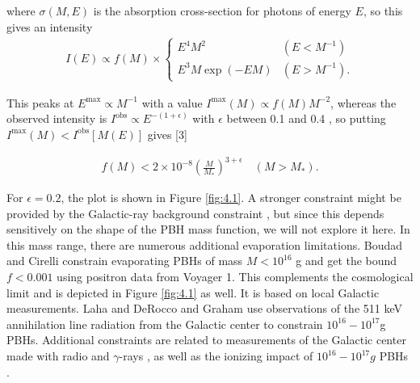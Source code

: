 where $\sigma(M, E)$ is the absorption cross-section for photons of energy $E$, so this gives an intensity
\begin{align}
    I(E) \propto f(M) \times \begin{cases}E^4 M^2 & \left(E<M^{-1}\right) \\ E^3 M \exp (-E M) & \left(E>M^{-1}\right) .\end{cases} \label{4.5}
\end{align}

This peaks at $E^{\max } \propto M^{-1}$ with a value $I^{\max }(M) \propto f(M) M^{-2}$, whereas the observed intensity is $I^{\mathrm{obs}} \propto E^{-(1+\epsilon)}$ with $\epsilon$ between 0.1 and 0.4 , so putting $I^{\max }(M)<I^{\mathrm{obs}}[M(E)]$ gives [3]

\begin{align}
    f(M)<2 \times 10^{-8}\left(\frac{M}{M_*}\right)^{3+\epsilon} \quad\left(M>M_*\right) .\label{4.6}
\end{align}


For $\epsilon = 0.2$, the plot is shown in Figure \ref{fig:4.1}. A stronger constraint might be provided by the Galactic-ray background constraint \cite{Carr:2016hva}, but since this depends sensitively on the shape of the PBH mass function, we will not explore it here. In this mass range, there are numerous additional evaporation limitations. Boudad and Cirelli \cite{Boudaud:2018hqb} constrain evaporating PBHs of mass $M < 10^{16}$ g and get the bound $f < 0.001$ using positron data from Voyager 1. This complements the cosmological limit and is depicted in Figure \ref{fig:4.1}   as well. It is based on local Galactic measurements. Laha \cite{Laha:2019ssq} and DeRocco and Graham \cite{DeRocco:2019fjq} use observations of the 511 keV annihilation line radiation from the Galactic center to constrain $10^{16}-10^{17}$g PBHs. Additional constraints are related to measurements of the Galactic center made with radio and $\gamma$-rays \cite{Laha:2020ivk},\cite{Chan:2020zry} as well as the ionizing impact of $10^{16}-10^{17}g$ PBHs \cite{Belotsky:2014twa}.
